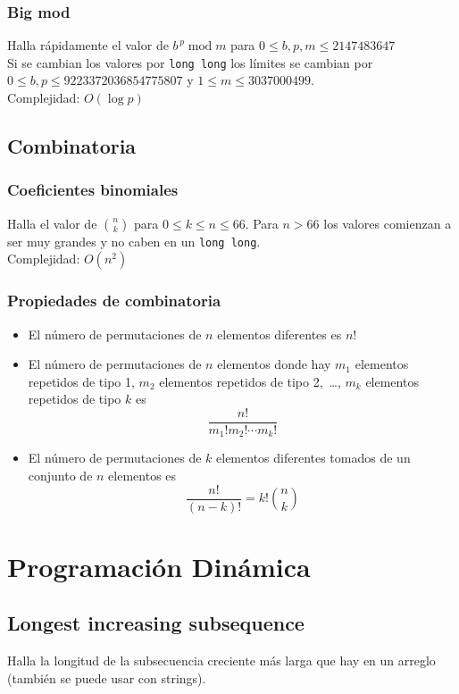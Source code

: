 \documentclass[10pt,letterpaper]{article}
\newcommand{\source}[1]{
  
  \dotfill
}
\begin{document}
    \subsubsection{Big mod}
    Halla rápidamente el valor de $b^{\,p} \operatorname{mod} m$ para $0 \leq b,p,m \leq 2147483647$\\
    Si se cambian los valores por \verb|long long| los límites se cambian por $0 \leq b,p \leq 9223372036854775807$ y $1 \leq m \leq 3037000499$.\\
    Complejidad: $O(\operatorname{log} p)$\\
    \source{./src/bigmod.cpp}

  \subsection{Combinatoria}
    \subsubsection{Coeficientes binomiales}
    Halla el valor de $\binom{n}{k}$ para $0 \leq k \leq n \leq 66$. Para $n > 66$ los valores comienzan a ser muy grandes y no caben en un \verb|long long|.\\
    Complejidad: $O(n^2)$\\
    \source{./src/binomial.cpp}

    \subsubsection{Propiedades de combinatoria}
    \begin{itemize}
      \item El número de permutaciones de $n$ elementos diferentes es $n!$
      \item El número de permutaciones de $n$ elementos donde hay $m_1$ elementos repetidos de tipo 1, $m_2$ elementos repetidos de tipo 2,~\ldots, $m_k$ elementos repetidos de tipo $k$ es $$\frac{n!}{m_1! m_2! \cdots m_k!} $$
      \item El número de permutaciones de $k$ elementos diferentes tomados de un conjunto de $n$ elementos es $$ \frac{n!}{(n-k)!} = k! \binom{n}{k}$$
    \end{itemize}

\section{Programación Dinámica}
  \subsection{Longest increasing subsequence}
    Halla la longitud de la subsecuencia creciente más larga que hay en un arreglo (también se puede usar con strings).
\end{document}
